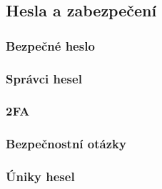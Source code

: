 \subsection{Hesla a zabezpečení}
\subsubsection{Bezpečné heslo}
\subsubsection*{Správci hesel}
\subsubsection{2FA}
\subsubsection{Bezpečnostní otázky}
\subsubsection{Úniky hesel}